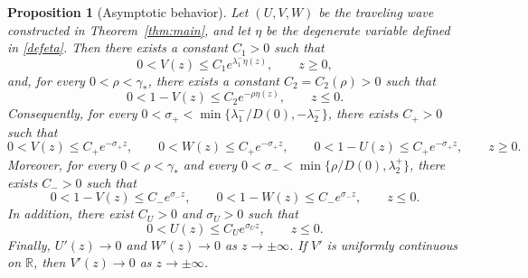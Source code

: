 \documentclass[preprint,sort&compress,final,12pt]{elsarticle}
\newtheorem{proposition}[theorem]{Proposition}
\numberwithin{equation}{section}
\begin{document}
\begin{proposition}[Asymptotic behavior]\label{prop:asymptotic-estimates}
Let $(U,V,W)$ be the traveling wave constructed in Theorem~\ref{thm:main}, and let $\eta$ be the degenerate variable defined in \eqref{defeta}. Then there exists a constant $C_1>0$ such that
\begin{equation}\label{eq:main-V-right-new}
0<V(z)\le C_1e^{\lambda_1^-\eta(z)}, \qquad z\ge0,
\end{equation}
and, for every $0<\rho<\gamma_*$, there exists a constant $C_2=C_2(\rho)>0$ such that
\begin{equation}\label{eq:main-V-left-new}
0<1-V(z)\le C_2e^{-\rho\eta(z)}, \qquad z\le0.
\end{equation}
Consequently, for every $0<\sigma_+<\min\{\lambda_1^-/D(0),-\lambda_2^-\}$, there exists $C_+>0$ such that
\begin{equation}\label{eq:main-right-tail-new}
0<V(z)\le C_+e^{-\sigma_+z},\qquad
0<W(z)\le C_+e^{-\sigma_+z},\qquad
0<1-U(z)\le C_+e^{-\sigma_+z},\qquad z\ge0.
\end{equation}
Moreover, for every $0<\rho<\gamma_*$ and every $0<\sigma_-<\min\{\rho/D(0),\lambda_2^+\}$, there exists $C_->0$ such that
\begin{equation}\label{eq:main-left-tail-new}
0<1-V(z)\le C_-e^{\sigma_-z},\qquad
0<1-W(z)\le C_-e^{\sigma_-z},\qquad z\le0.
\end{equation}
In addition, there exist $C_U>0$ and $\sigma_U>0$ such that
\begin{equation}\label{eq:main-U-left-new}
0<U(z)\le C_Ue^{\sigma_Uz},\qquad z\le0.
\end{equation}
Finally, $U'(z)\to0$ and $W'(z)\to0$ as $z\to\pm\infty$. If $V'$ is uniformly continuous on $\mathbb R$, then $V'(z)\to0$ as $z\to\pm\infty$.
\end{proposition}
\end{document}
